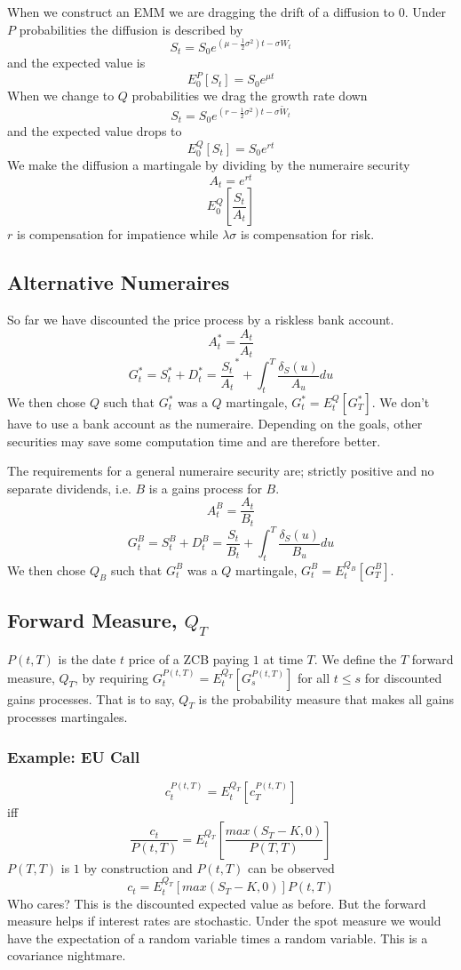 \documentclass[12pt]{article}
\begin{document}
When we construct an EMM we are dragging the drift of a diffusion to $0$. Under
$P$ probabilities the diffusion is described by
$$S_t=S_0e^{(\mu-\frac{1}{2}\sigma^2)t-\sigma W_t}$$
and the expected value is
$$E_0^P[S_t]=S_0e^{\mu t}$$
When we change to $Q$ probabilities we drag the growth rate down
$$S_t=S_0e^{(r-\frac{1}{2}\sigma^2)t-\sigma\tilde{W}_t}$$
and the expected value drops to
$$E_0^Q[S_t]=S_0e^{rt}$$
We make the diffusion a martingale by dividing by the numeraire security
$$A_t=e^{rt}$$
$$E_0^Q\left[\frac{S_t}{A_t}\right]$$
$r$ is compensation for impatience while $\lambda\sigma$ is compensation for
risk.

\subsection{Alternative Numeraires}

So far we have discounted the price process by a riskless bank account.
$$A_t^*=\frac{A_t}{A_t}$$
$$G_t^*=S_t^*+D_t^*=\frac{S_t}{A_t}^*+\int_t^T\frac{\delta_S(u)}{A_u}du$$
We then chose $Q$ such that $G_t^*$ was a $Q$ martingale, $G_t^*=E_t^Q[G_T^*]$.
We don't have to use a bank account as the numeraire.
Depending on the goals, other securities may save some computation time and are
therefore better.

The requirements for a general numeraire security are; strictly positive and no
separate dividends, i.e. $B$ is a gains process for $B$.
$$A_t^B=\frac{A_t}{B_t}$$
$$G_t^B=S_t^B+D_t^B=\frac{S_t}{B_t}+\int_t^T\frac{\delta_S(u)}{B_u}du$$
We then chose $Q_B$ such that $G_t^B$ was a $Q$ martingale,
$G_t^B=E_t^{Q_B}[G_T^B]$.

\subsection{Forward Measure, $Q_T$}

$P(t,T)$ is the date $t$ price of a ZCB paying $1$ at time $T$. We define the
$T$ forward measure, $Q_T$, by requiring
$G_t^{P(t,T)}=E_t^{Q_T}[G_s^{P(t,T)}]$ for all $t\leq s$ for discounted gains
processes. That is to say, $Q_T$ is the probability measure that makes all
gains processes martingales.

\subsubsection{Example: EU Call}

$$c_t^{P(t,T)}=E_t^{Q_T}[c_T^{P(t,T)}]$$
iff
$$\frac{c_t}{P(t,T)}=E_t^{Q_T}\left[\frac{max(S_T-K,0)}{P(T,T)}\right]$$
$P(T,T)$ is $1$ by construction and $P(t,T)$ can be observed
$$c_t=E_t^{Q_T}[max(S_T-K,0)]P(t,T)$$
Who cares? This is the discounted expected value as before. But the forward
measure helps if interest rates are stochastic. Under the spot measure we would
have the expectation of a random variable times a random variable. This is
a covariance nightmare.
\end{document}
